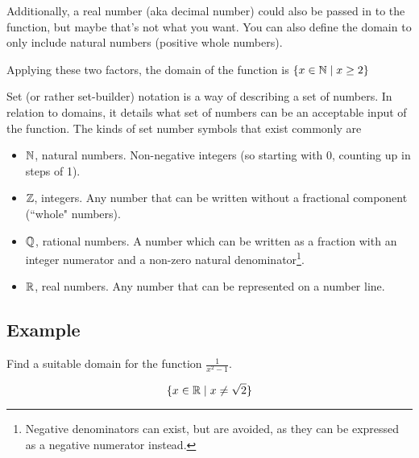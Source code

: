 Additionally, a real number (aka decimal number) could also be passed in to the function, but maybe that's not what you want. You can also define the domain to only include natural numbers (positive whole numbers).

Applying these two factors, the domain of the function is $\{x \in \mathbb{N} \mid x \geq 2\}$

Set (or rather set-builder) notation is a way of describing a set of numbers. In relation to domains, it details what set of numbers can be an acceptable input of the function. The kinds of set number symbols that exist commonly are
\begin{itemize}
	\item $\mathbb{N}$, natural numbers. Non-negative integers (so starting with 0, counting up in steps of 1).
	\item $\mathbb{Z}$, integers. Any number that can be written without a fractional component (``whole" numbers).
	\item $\mathbb{Q}$, rational numbers. A number which can be written as a fraction with an integer numerator and a non-zero natural denominator\footnote{Negative denominators can exist, but are avoided, as they can be expressed as a negative numerator instead.}.
	\item $\mathbb{R}$, real numbers. Any number that can be represented on a number line.
\end{itemize}

\subsection{Example}
Find a suitable domain for the function $\frac{1}{x^2-1}$.

\begin{equation*}
	\{x \in \mathbb{R} \mid x \neq \sqrt{2}\}
\end{equation*}